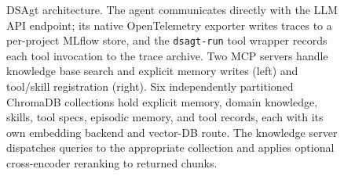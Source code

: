 \documentclass[11pt]{article}
\begin{document}
\begin{figure}[t]
{%
}%
\caption{%
  DSAgt architecture.
  The agent communicates directly with the LLM API endpoint;
  its native OpenTelemetry exporter writes traces to a
  per-project MLflow store, and the \texttt{dsagt-run}
  tool wrapper records each tool invocation to the trace
  archive.
  Two MCP servers handle knowledge base search and explicit
  memory writes (left) and tool/skill registration (right).
  Six independently partitioned ChromaDB collections hold
  explicit memory, domain knowledge, skills, tool specs,
  episodic memory, and tool records, each with its own
  embedding backend and vector-DB route.
  The knowledge server dispatches queries to the appropriate
  collection and applies optional cross-encoder reranking
  to returned chunks.}
\label{fig:architecture}
\end{figure}

\end{document}
